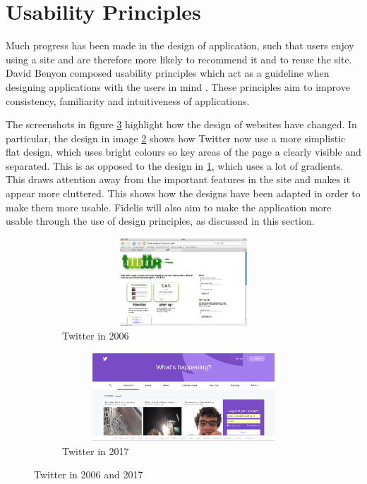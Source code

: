 \section{Usability Principles}
Much progress has been made in the design of application, such that users enjoy using a site and are therefore more likely to recommend it and to reuse the site. David Benyon composed usability principles which act as a guideline when designing applications with the users in mind \cite{Benyon}. These principles aim to improve consistency, familiarity and intuitiveness of applications.

The screenshots in figure \ref{fig:Twitter_Changes} highlight how the design of websites have changed. In particular, the design in image \ref{fig:Twitter_2017} shows how Twitter now use a more simplistic flat design, which uses bright colours so key areas of the page a clearly visible and separated. This is as opposed to the design in \ref{fig:Twitter_2006}, which uses a lot of gradients. This draws attention away from the important features in the site and makes it appear more cluttered. This shows how the designs have been adapted in order to make them more usable. Fidelis will also aim to make the application more usable through the use of design principles, as discussed in this section.

\begin{figure}[H]
	\centering
	\begin{subfigure}[t]{0.45\textwidth}
		\centering
		\includegraphics[width=1.0\textwidth, height=125px]{Images/Design/Twitter_2006}
		\caption{Twitter in 2006}\label{fig:Twitter_2006}		
	\end{subfigure}
	\quad
	\begin{subfigure}[t]{0.45\textwidth}
		\centering
		\includegraphics[width=1.0\textwidth, height=125px]{Images/Design/Twitter_2017}
		\caption{Twitter in 2017}\label{fig:Twitter_2017}
	\end{subfigure}
	\caption{Twitter in 2006 and 2017}\label{fig:Twitter_Changes}
\end{figure}


